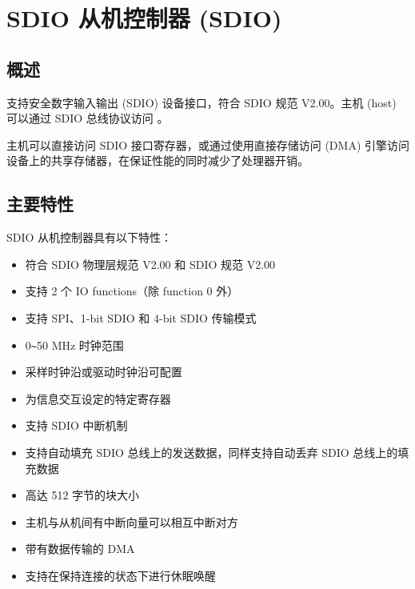 \documentclass[main\_\_CN.tex]{subfiles}
\begin{document}

\ifglobal
\else
    \listoftodos
    {\let\clearpage\relax \listofdonetodos}
    \tableofcontents
\fi



\hypertarget{sdioslave}{}
\chapter{SDIO 从机控制器 (SDIO)}
\label{mod:sdioslave}



\section{概述}
\chipname{} 支持安全数字输入输出 (SDIO) 设备接口，符合 SDIO 规范 V2.00。主机 (host) 可以通过 SDIO 总线协议访问 \chipname{}。

主机可以直接访问 \chipname{} SDIO 接口寄存器，或通过使用直接存储访问 (DMA) 引擎访问设备上的共享存储器，在保证性能的同时减少了处理器开销。

\section{主要特性}
SDIO 从机控制器具有以下特性：

\begin{itemize}
    \item 符合 SDIO 物理层规范 V2.00 和 SDIO 规范 V2.00
    \item 支持 2 个 IO functions（除 function 0 外）
    \item 支持 SPI、1-bit SDIO 和 4-bit SDIO 传输模式
    \item 0\verb+~+50 MHz 时钟范围
    \item 采样时钟沿或驱动时钟沿可配置
    \item 为信息交互设定的特定寄存器
    \item 支持 SDIO 中断机制
    \item 支持自动填充 SDIO 总线上的发送数据，同样支持自动丢弃 SDIO 总线上的填充数据
    \item 高达 512 字节的块大小
    \item 主机与从机间有中断向量可以相互中断对方
    \item 带有数据传输的 DMA
    \item 支持在保持连接的状态下进行休眠唤醒
\end{itemize}
\end{document}
